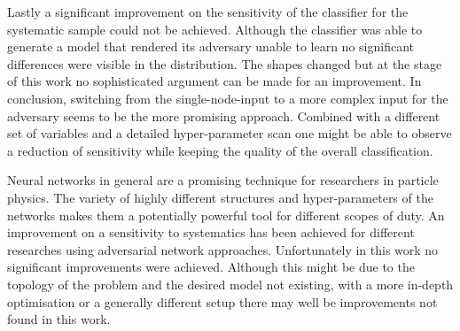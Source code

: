 Lastly a significant improvement on the sensitivity of the classifier for the systematic sample could not be achieved. Although the classifier was able to generate a model that rendered its adversary unable to learn no significant differences were visible in the distribution. The shapes changed but at the stage of this work no sophisticated argument can be made for an improvement. In conclusion, switching from the single-node-input to a more complex input for the adversary seems to be the more promising approach. Combined with a different set of variables and a detailed hyper-parameter scan one might be able to observe a reduction of sensitivity while keeping the quality of the overall classification.

Neural networks in general are a promising technique for researchers in particle physics. The variety of highly different structures and hyper-parameters of the networks makes them a potentially powerful tool for different scopes of duty. An improvement on a sensitivity to systematics has been achieved for different researches using adversarial network approaches. Unfortunately in this work no significant improvements were achieved. Although this might be due to the topology of the problem and the desired model not existing, with a more in-depth optimisation or a generally different setup there may well be improvements not found in this work.

